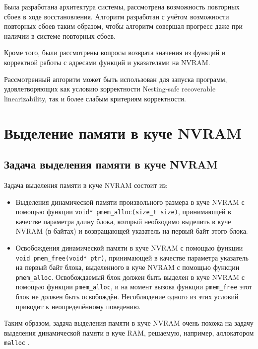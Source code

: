 \documentclass[times,specification,annotation]{itmo-student-thesis}
\begin{document}
Была разработана архитектура системы, рассмотрена возможность повторных сбоев в ходе восстановления. Алгоритм разработан с учётом возможности повторных сбоев таким образом, чтобы алгоритм совершал прогресс даже при наличии в системе повторных сбоев.

Кроме того, были рассмотрены вопросы возврата значения из функций и корректной работы с адресами функций и указателями на NVRAM.

Рассмотренный апгоритм может быть использован для запуска программ, удовлетворяющих как условию корректности Nesting-safe recoverable linearizability, так и более слабым критериям корректности.

\chapter{Выделение памяти в куче NVRAM}
\label{nvram-allocation}

\section{Задача выделения памяти в куче NVRAM}

Задача выделения памяти в куче NVRAM состоит из:

\begin{itemize}
    \item Выделения динамической памяти произвольного размера в куче NVRAM с помощью функции \texttt{void* pmem\_alloc(size\_t size)}, принимающей в качестве параметра длину блока, который необходимо выделить в куче NVRAM (в байтах) и возвращающей указатель на первый байт этого блока.
    
    \item Освобождения динамической памяти в куче NVRAM с помощью функции \texttt{void pmem\_free(void* ptr)}, принимающей в качестве параметра указатель на первый байт блока, выделенного в куче NVRAM с помощью функции \texttt{pmem\_alloc}. Освобождаемый блок должен быть выделен в куче NVRAM с помощью функции \texttt{pmem\_alloc}, и на момент вызова функции \texttt{pmem\_free} этот блок не должен быть освобождён. Несоблюдение одного из этих условий приводит к неопределённому поведению.
\end{itemize}

\bigbreak

Таким образом, задача выделения памяти в куче NVRAM очень похожа на задачу выделения динамической памяти в куче RAM, решаемую, например, аллокатором \texttt{malloc} \cite{malloc}.
\end{document}
